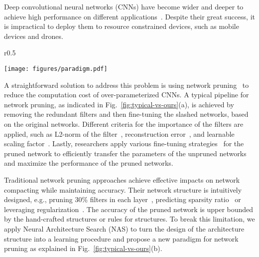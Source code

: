 \documentclass{article}
\def\Figref#1{Fig.~\ref{#1}}
\begin{document}
Deep convolutional neural networks (CNNs) have become wider and deeper to achieve high performance on different applications~\cite{he2016deep,huang2017densely,zoph2017neural}.
Despite their great success, it is impractical to deploy them to resource constrained devices, such as mobile devices and drones.
\begin{wrapfigure}{r}{0.5\textwidth}
\vspace{-5mm}
  \begin{center}
    \texttt{[image: figures/paradigm.pdf]}
  \end{center}
\vspace{-3mm}
\caption{A comparison between the typical pruning paradigm and the proposed paradigm.
}
\vspace{-5mm}
\label{fig:typical-vs-ours}
\end{wrapfigure}
A straightforward solution to address this problem is using network pruning~\cite{lecun1990optimal,han2016deep,han2016learning,he2017channel,he2018soft} to reduce the computation cost of over-parameterized CNNs. 
A typical pipeline for network pruning, as indicated in \Figref{fig:typical-vs-ours}(a), is achieved by removing the redundant filters and then fine-tuning the slashed networks, based on the original networks.
Different criteria for the importance of the filters are applied, such as L2-norm of the filter~\cite{li2017pruning}, reconstruction error~\cite{he2017channel}, and learnable scaling factor~\cite{liu2017learning}.
Lastly, researchers apply various fine-tuning strategies~\cite{li2017pruning,he2018soft} for the pruned network to efficiently transfer the parameters of the unpruned networks and maximize the performance of the pruned networks.






Traditional network pruning approaches achieve effective impacts on network compacting while maintaining accuracy.
Their network structure is intuitively designed, e.g., pruning 30\% filters in each layer~\cite{li2017pruning,he2018soft}, predicting sparsity ratio~\cite{he2018amc} or leveraging regularization~\cite{alvarez2016learning}.
The accuracy of the pruned network is upper bounded by the hand-crafted structures or rules for structures.
To break this limitation, we apply Neural Architecture Search (NAS) to turn the design of the architecture structure into a learning procedure and propose a new paradigm for network pruning as explained in \Figref{fig:typical-vs-ours}(b).
\end{document}
